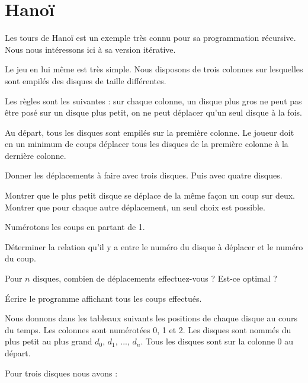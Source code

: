 \renewcommand{\SourceFile}{8-vers-la-recursivite/src/8-4.ml}

\section{Hanoï}

Les tours de Hanoï est un exemple très connu pour sa programmation récursive. Nous nous intéressons ici à sa version itérative.
\medskip

Le jeu en lui même est très simple. Nous disposons de trois colonnes sur lesquelles sont empilés des disques de taille différentes.
\medskip

Les règles sont les suivantes : sur chaque colonne, un disque plus gros ne peut pas être posé sur un disque plus petit, on ne peut déplacer qu'un seul disque à la fois.
\medskip

Au départ, tous les disques sont empilés sur la première colonne. Le joueur doit en un minimum de coups déplacer tous les disques de la première colonne à la dernière colonne.

\Q
Donner les déplacements à faire avec trois disques. Puis avec quatre disques.

\Q
Montrer que le plus petit disque se déplace de la même façon un coup sur deux. Montrer que pour chaque autre déplacement, un seul choix est possible.

\Q
Numérotons les coups en partant de 1.
\medskip

Déterminer la relation qu'il y a entre le numéro du disque à déplacer et le numéro du coup.
\medskip

Pour $n$ disques, combien de déplacements effectuez-vous ? Est-ce optimal ?
\medskip

Écrire le programme affichant tous les coups effectués.

\Corrige

\Q
Nous donnons dans les tableaux suivants les positions de chaque disque au cours du temps. Les colonnes sont numérotées 0, 1 et 2. Les disques sont nommés du plus petit au plus grand $d_0$, $d_1$, ..., $d_n$. Tous les disques sont sur la colonne 0 au départ.
\medskip

Pour trois disques nous avons :
\medskip

\medskip

